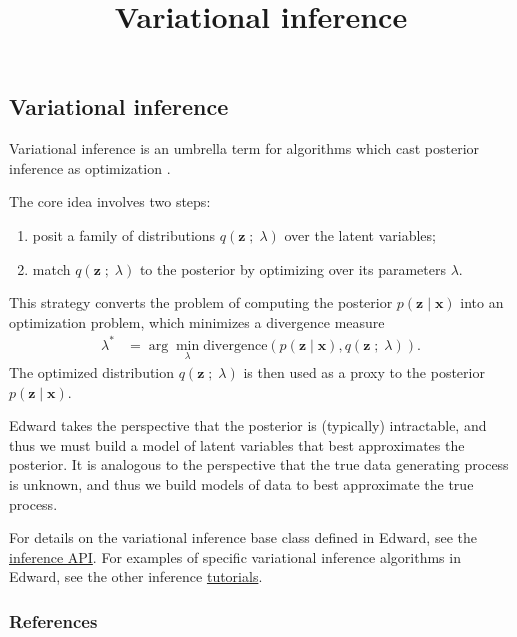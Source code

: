 \title{Variational inference}

\subsection{Variational inference}

Variational inference is an umbrella term for algorithms which cast
posterior inference as optimization
\citep{hinton1993keeping,waterhouse1996bayesian,jordan1999introduction}.

The core idea involves two steps:
\begin{enumerate}
   \item posit a family of distributions $q(\mathbf{z}\;;\;\lambda)$
   over the latent variables;
   \item match $q(\mathbf{z}\;;\;\lambda)$ to the posterior by
   optimizing over its parameters $\lambda$.
 \end{enumerate}
This strategy converts the problem of computing the posterior
$p(\mathbf{z} \mid \mathbf{x})$ into an optimization problem, which
minimizes a divergence measure
\begin{align*}
  \lambda^*
  &=
  \arg\min_\lambda \text{divergence}(
  p(\mathbf{z} \mid \mathbf{x})
  ,
  q(\mathbf{z}\;;\;\lambda)
  ).
\end{align*}
The optimized distribution $q(\mathbf{z}\;;\;\lambda)$ is then used as
a proxy to the posterior $p(\mathbf{z}\mid \mathbf{x})$.

Edward takes the perspective that the posterior is (typically)
intractable, and thus we must build a model of latent variables that
best approximates the posterior.
It is analogous to the perspective
that the true data generating process is unknown, and thus we build
models of data to best approximate the true process.

For details on the variational inference base class defined in Edward,
see the \href{/api/inference}{inference API}.
For examples of specific variational inference algorithms in
Edward, see the other inference \href{/tutorials/}{tutorials}.

\subsubsection{References}\label{references}

